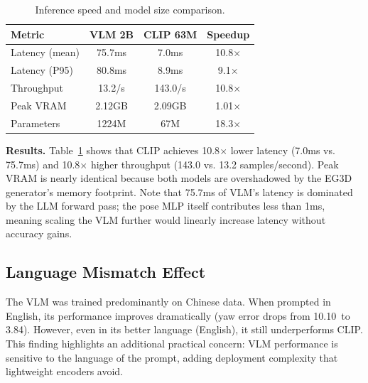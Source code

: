 \begin{table}[t]
\centering
\caption{Inference speed and model size comparison.}
\label{tab:speed}
\begin{tabular}{lccc}
\toprule
Metric & VLM 2B & CLIP 63M & Speedup \\
\midrule
Latency (mean) & 75.7ms & 7.0ms & 10.8$\times$ \\
Latency (P95) & 80.8ms & 8.9ms & 9.1$\times$ \\
Throughput & 13.2/s & 143.0/s & 10.8$\times$ \\
Peak VRAM & 2.12GB & 2.09GB & 1.01$\times$ \\
Parameters & 1224M & 67M & 18.3$\times$ \\
\bottomrule
\end{tabular}
\end{table}

\textbf{Results.} Table~\ref{tab:speed} shows that CLIP achieves 10.8$\times$ lower latency (7.0ms vs. 75.7ms) and 10.8$\times$ higher throughput (143.0 vs. 13.2 samples/second). Peak VRAM is nearly identical because both models are overshadowed by the EG3D generator's memory footprint. Note that 75.7ms of VLM's latency is dominated by the LLM forward pass; the pose MLP itself contributes less than 1ms, meaning scaling the VLM further would linearly increase latency without accuracy gains.

\subsection{Language Mismatch Effect}
\label{sec:exp_lang}

The VLM was trained predominantly on Chinese data. When prompted in English, its performance improves dramatically (yaw error drops from 10.10\textdegree~to 3.84\textdegree). However, even in its better language (English), it still underperforms CLIP. This finding highlights an additional practical concern: VLM performance is sensitive to the language of the prompt, adding deployment complexity that lightweight encoders avoid.
